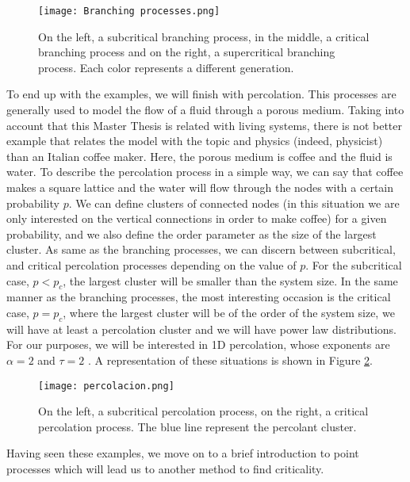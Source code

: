 \begin{figure}[H]
    \centering
    \texttt{[image: Branching processes.png]}
    \caption{On the left, a subcritical branching process, in the middle, a critical branching process and on the right, a supercritical branching process. Each color represents a different
    generation.}
    \label{f:branching_processes}   
\end{figure}

To end up with the examples, we will finish with percolation. This processes are generally used to model the flow of a fluid through a porous medium. Taking into account that this Master 
Thesis is related with living systems, there is not better example that relates the model with the topic and physics (indeed, physicist) than an Italian coffee maker. Here, the porous 
medium is coffee and the fluid is water. To describe the percolation process in a simple way, we can say that coffee makes a square lattice and the water will flow through the nodes 
with a certain probability $p$. We can define clusters of connected nodes (in this situation we are only interested on the vertical connections in order to make coffee)
for a given probability, and we also define the order parameter as the size of the largest cluster. 
As same as the branching processes, we can discern between subcritical, and critical percolation processes depending on the value of $p$. For the subcritical case, $p<p_c$,
the largest cluster will be smaller than the system size. In the same manner as the branching processes, the most interesting occasion is the critical case, $p=p_c$, 
where the largest cluster will be of the order of the system size, we will have at least a percolation cluster 
and we will have power law distributions. For our purposes, we will be interested in 1D percolation, whose exponents 
are $\alpha=2$ and $\tau=2$ \cite{stauffer2018introduction}. A representation of these situations is shown in Figure \ref{f:percolation}.

\begin{figure}[H]
    \centering
    \texttt{[image: percolacion.png]}
    \caption{On the left, a subcritical percolation process, on the right, a critical percolation process. The blue line represent the percolant cluster.}
    \label{f:percolation}
\end{figure}

Having seen these examples, we move on to a brief introduction to point processes which will lead us to another method to find criticality.

